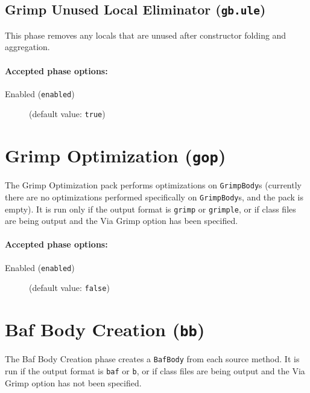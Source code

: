 \documentclass{article}
\begin{document}
\subsection{Grimp Unused Local Eliminator ({\tt gb.ule})}

This phase removes any locals that are unused after constructor
folding and aggregation.


\paragraph{Accepted phase options:} 

\begin{description}

\item[Enabled ({\tt enabled})]
(default value: {\tt true})






\end{description}

\section{Grimp Optimization ({\tt gop})}

The Grimp Optimization pack performs optimizations on
{\tt GrimpBody}s (currently there are no optimizations
performed specifically on {\tt GrimpBody}s, and the pack is
empty). It is run only if the output format is {\tt grimp} or
{\tt grimple}, or if class files are being output and the Via
Grimp option has been specified.


\paragraph{Accepted phase options:} 

\begin{description}

\item[Enabled ({\tt enabled})]
(default value: {\tt false})






\end{description}

\section{Baf Body Creation ({\tt bb})}

The Baf Body Creation phase creates a
{\tt BafBody} from each source method. It is
run if the output format is {\tt baf} or {\tt b}, or
if class files are being output and the Via Grimp option
has not been specified.
\end{document}
